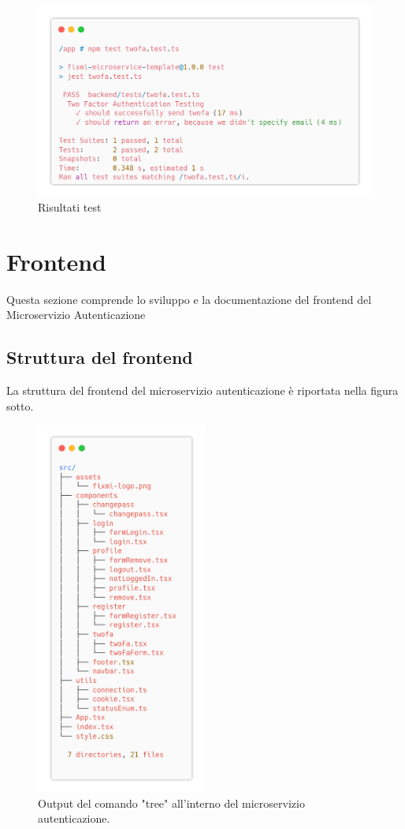 \documentclass{report}
\begin{document}
\begin{figure}[H]
	\centering\includegraphics[width=1\textwidth]{images/microservizio-autenticazione/tests/twofa_test_results.png}
	\caption{Risultati test}
\end{figure}


\section{Frontend}

Questa sezione comprende lo sviluppo e la documentazione del frontend del Microservizio Autenticazione

\subsection{Struttura del frontend}
La struttura del frontend del microservizio autenticazione è riportata
nella figura sotto.
\begin{figure}[H]
	\centering\includegraphics[width=0.5\textwidth]{images/microservizio-autenticazione/frontend-structure.png}
	\caption{Output del comando "tree" all'interno del microservizio autenticazione.}
\end{figure}
\end{document}
